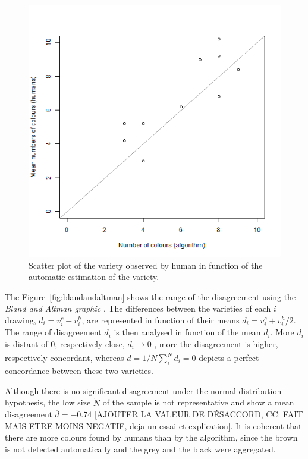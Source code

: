 \documentclass[11pt,a4paper]{article}
\begin{document}
\begin{figure}[h!]
	\centering
	\includegraphics[width=\linewidth]{figures/comp_nb_colours_scatter.png}
	\caption{Scatter plot of the variety observed by human in function of the automatic estimation of the variety.}
	\label{fig:compnbcoloursscatter}
\end{figure}



The Figure~\ref{fig:blandandaltman} shows the range of the disagreement using the \textit{Bland and Altman graphic} \cite{bland1986}.
The differences between the varieties of each $i$ drawing,  $d_i = v^c_i - v^h_i$, are represented in function of their means $\overline{d}_i = v^c_i + v^h_i/2$. 
The range of disagreement $d_i$ is then analysed in function of the mean $\overline{d}_i$. More $d_i$ is distant of  $0$, respectively close, $d_i \rightarrow 0$ , more the disagreement is higher, respectively concordant,  whereas $\overline{d} = 1/N\sum_{i}^{\tilde{N}}d_i = 0$ depicts a perfect concordance between these two varieties. 



Although there is no significant disagreement under the normal distribution hypothesis, the low size $\tilde{N}$ of the sample is not representative and show a mean disagreement $\overline{d}=-0.74$ {\color{red}[AJOUTER LA VALEUR DE D\'ESACCORD, CC: FAIT MAIS ETRE MOINS NEGATIF, deja un essai et explication]}. It is coherent that there are more colours found by humans than by the algorithm, since the brown is not detected automatically and the grey and the black were aggregated.
\end{document}
